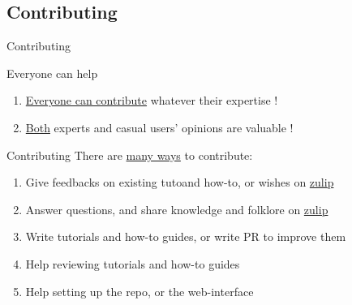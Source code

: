 \documentclass[10pt]{beamer}
\begin{document}
\subsection{Contributing}


\begin{frame}{Contributing}
  \begin{tcbObj}{Everyone can help}
    \begin{enumerate}
      \item<1-> \ul{Everyone can contribute} whatever their expertise !
      \item<2-> \ul{Both} experts and casual users' opinions are valuable !
    \end{enumerate}
  \end{tcbObj}
  \begin{tcbProp}{Contributing}
    There are \ul{many ways} to contribute:
    \begin{enumerate}
      \item<3-> Give feedbacks on existing tutoand how-to, or wishes on
      \textcolor{blue}{\href{https://www.theozimmermann.net/platform-docs/}{zulip}}
      \item<4-> Answer questions, and share knowledge and folklore on
      \textcolor{blue}{\href{https://www.theozimmermann.net/platform-docs/}{zulip}}
      \item<5-> Write tutorials and how-to guides, or write PR to improve them
      \item<6-> Help reviewing tutorials and how-to guides
      \item<7-> Help setting up the repo, or the web-interface
    \end{enumerate}
  \end{tcbProp}
\end{frame}
\end{document}

